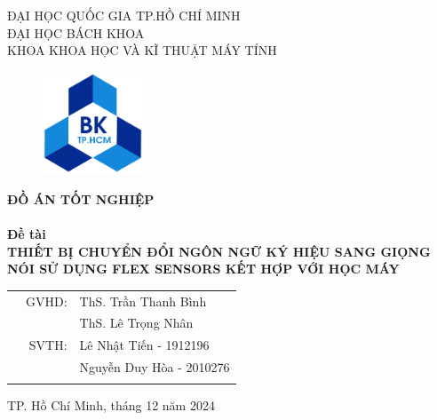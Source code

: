 \documentclass[a4paper]{article}
\begin{document}
\begin{titlepage}
\begin{center}
ĐẠI HỌC QUỐC GIA TP.HỒ CHÍ MINH \\
ĐẠI HỌC BÁCH KHOA \\
KHOA KHOA HỌC VÀ KĨ THUẬT MÁY TÍNH
\end{center}

\vspace{1cm}

\begin{figure}[h!]
\begin{center}
\includegraphics[width=3cm]{hcmut.png}
\end{center}
\end{figure}

\vspace{1cm}

\begin{center}
\textbf{\Large ĐỒ ÁN TỐT NGHIỆP}\\
\hrulefill \\
\vspace{.3cm}
\textbf{\Large Đề tài}\\
\vspace{.3cm}
\textbf{\Large THIẾT BỊ CHUYỂN ĐỔI NGÔN NGỮ KÝ HIỆU SANG GIỌNG NÓI SỬ DỤNG FLEX SENSORS KẾT HỢP VỚI HỌC MÁY
 } \\
\hrulefill
\end{center}


\vspace{3cm}

\begin{table}[h]
\begin{tabular}{rrl}
\hspace{5 cm} & GVHD: & ThS. Trần Thanh Bình\\
& &  ThS. Lê Trọng Nhân  \\
& SVTH: & Lê Nhật Tiến - 1912196 \\
& & Nguyễn Duy Hòa - 2010276  \\
& & \\
\end{tabular}
\end{table}

\begin{center}
{\footnotesize TP. Hồ Chí Minh, tháng 12 năm 2024}
\end{center}
\end{titlepage}
\end{document}
